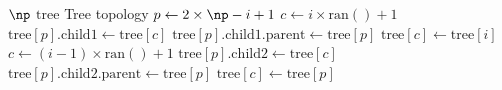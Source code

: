 \begin{algorithmic}[1]
\REQUIRE $\np$ 
\REQUIRE $\mathrm{tree}$ 
\ENSURE Tree topology
   \STATE $p\leftarrow 2\times \np - i + 1$  %
   \STATE $c\leftarrow i\times \mathrm{ran()} + 1$ 
   \STATE $\mathrm{tree}[p].\mathrm{child}1\leftarrow\mathrm{tree}[c]$ 
   \STATE $\mathrm{tree}[p].\mathrm{child}1.\mathrm{parent}\leftarrow \mathrm{tree}[p]$
   \STATE $\mathrm{tree}[c]\leftarrow\mathrm{tree}[i]$
   \STATE $c\leftarrow (i-1)\times\mathrm{ran()} + 1$ 
   \STATE $\mathrm{tree}[p].\mathrm{child2}\leftarrow\mathrm{tree}[c]$
   \STATE $\mathrm{tree}[p].\mathrm{child2}.\mathrm{parent}\leftarrow\mathrm{tree}[p]$
   \STATE $\mathrm{tree}[c]\leftarrow\mathrm{tree}[p]$
\ENDFOR
\end{algorithmic}
